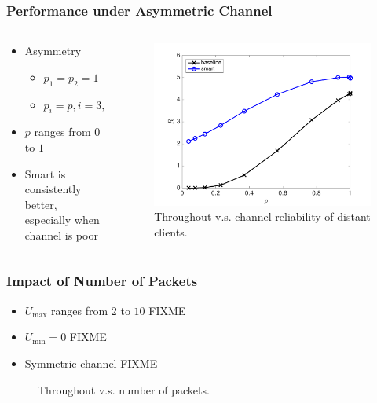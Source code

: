 \documentclass{beamer}
\begin{document}
\begin{frame}
\frametitle{Performance under Asymmetric Channel}
\begin{columns}
  \begin{column}{.5\textwidth}
\begin{itemize}
  \item Asymmetry
    \begin{itemize}
      \item $p_1=p_2=1$
      \item $p_i=p, i=3,4,\dotsc,N$
    \end{itemize}
  \item $p$ ranges from $0$ to $1$
  \item Smart is consistently better, especially when channel is poor
\end{itemize}
  \end{column}
  \begin{column}{.5\textwidth}
\begin{figure}[htbp]
  \centering
  \includegraphics[height=.5\textheight]{R_p_asym.pdf}
  \caption{Throughout v.s. channel reliability of distant clients.}
\end{figure}
  \end{column}
\end{columns}
\end{frame}

\begin{frame}
\frametitle{Impact of Number of Packets}
\begin{itemize}
  \item $U_\text{max}$ ranges from $2$ to $10$ FIXME
  \item $U_\text{min}=0$ FIXME
  \item Symmetric channel FIXME
\end{itemize}
\begin{figure}[htbp]
  \centering
  \caption{Throughout v.s. number of packets.}
\end{figure}
\end{frame}
\end{document}
